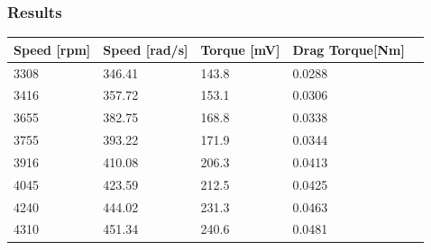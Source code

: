 \subsubsection{Results}
\begin{table}[H]
	\centering
	\begin{tabular}{|l|l|l|l|p{4.3cm}|}
		\hline%
		\textbf{Speed [rpm]}    & \textbf{Speed [rad/s]} & \textbf{Torque [mV]}  & \textbf{Drag Torque[Nm]} \\ 
		\hline%
		3308 						       &  346.41 				           & 143.8                 & 0.0288         \\
		\hline%
		3416                               &  357.72   			               & 153.1                 & 0.0306         \\
		\hline%
		3655                               &  382.75  			               & 168.8                 & 0.0338         \\
		\hline%
		3755                               &  393.22                           & 171.9                 & 0.0344         \\
		\hline%
		3916 						       &  410.08				           & 206.3                 & 0.0413         \\
		\hline%
		4045                               &  423.59    			           & 212.5                 & 0.0425         \\
		\hline%
		4240                               &  444.02                           & 231.3                 & 0.0463         \\
		\hline%
		4310 						       &  451.34			           & 240.6                 & 0.0481         \\
		\hline%
				
	\end{tabular}
\end{table}

